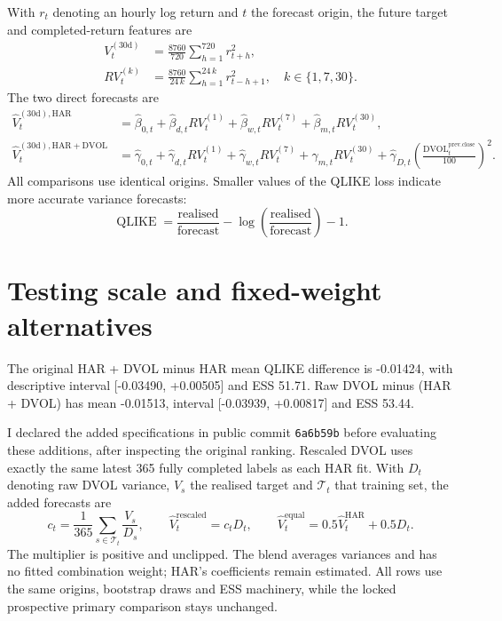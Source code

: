 \documentclass[10pt,a4paper]{article}
\newcommand{\Unit}{1}
\newcommand{\PowerTwo}{2}
\newcommand{\InterceptIndex}{0}
\newcommand{\HorizonDays}{30}
\newcommand{\TargetHours}{720}
\newcommand{\AnnualHoursPlain}{8760}
\newcommand{\HoursPerDay}{24}
\newcommand{\DailyDays}{1}
\newcommand{\WeeklyDays}{7}
\newcommand{\MonthlyDays}{30}
\newcommand{\PercentScale}{100}
\newcommand{\PairedLossMean}{-0.01424}
\newcommand{\PairedLossLower}{-0.03490}
\newcommand{\PairedLossUpper}{+0.00505}
\newcommand{\PairedLossEffectiveN}{51.71}
\newcommand{\TrainingLabels}{365}
\newcommand{\QLIKEUnit}{1}
\newcommand{\RawPairedMean}{-0.01513}
\newcommand{\RawPairedLower}{-0.03939}
\newcommand{\RawPairedUpper}{+0.00817}
\newcommand{\RawPairedESS}{53.44}
\newcommand{\BlendWeight}{0.5}
\newcommand{\ExtensionSpecificationCommit}{6a6b59b}
\begin{document}
With $r_t$ denoting an hourly log return and $t$ the forecast origin, the future target and completed-return features are
\begin{align*}
V_t^{(\HorizonDays{}\mathrm{d})} &= \frac{\AnnualHoursPlain{}}{\TargetHours{}}
  \sum_{h=\Unit{}}^{\TargetHours{}} r_{t+h}^{\PowerTwo{}},\\
RV_t^{(k)} &= \frac{\AnnualHoursPlain{}}{\HoursPerDay{}\,k}
  \sum_{h=\Unit{}}^{\HoursPerDay{}\,k}r_{t-h+\Unit{}}^{\PowerTwo{}},
\quad k\in\{\DailyDays{},\WeeklyDays{},\MonthlyDays{}\}.
\end{align*}
The two direct forecasts are
\begin{align*}
\widehat V^{(\HorizonDays{}\mathrm{d}),\mathrm{HAR}}_t
 &= \widehat\beta_{\InterceptIndex{},t}
  +\widehat\beta_{d,t}RV_t^{(\DailyDays{})}
  +\widehat\beta_{w,t}RV_t^{(\WeeklyDays{})}
  +\widehat\beta_{m,t}RV_t^{(\MonthlyDays{})},\\
\widehat V^{(\HorizonDays{}\mathrm{d}),\mathrm{HAR+DVOL}}_t
 &= \widehat\gamma_{\InterceptIndex{},t}
  +\widehat\gamma_{d,t}RV_t^{(\DailyDays{})}
  +\widehat\gamma_{w,t}RV_t^{(\WeeklyDays{})}
  +\widehat\gamma_{m,t}RV_t^{(\MonthlyDays{})}
  +\widehat\gamma_{D,t}
    \left(\frac{\mathrm{DVOL}^{\mathrm{prev.close}}_t}{\PercentScale{}}\right)^{\PowerTwo{}}.
\end{align*}
All comparisons use identical origins. Smaller values of the QLIKE loss indicate more accurate variance forecasts:
\[
\operatorname{QLIKE}
 =\frac{\text{realised}}{\text{forecast}}
  -\log\!\left(\frac{\text{realised}}{\text{forecast}}\right)
  -\QLIKEUnit{}.
\]

\section{Testing scale and fixed-weight alternatives}

The original HAR + DVOL minus HAR mean QLIKE difference is \PairedLossMean{}, with descriptive interval [\PairedLossLower{}, \PairedLossUpper{}] and ESS \PairedLossEffectiveN{}. Raw DVOL minus (HAR + DVOL) has mean \RawPairedMean{}, interval [\RawPairedLower{}, \RawPairedUpper{}] and ESS \RawPairedESS{}.

I declared the added specifications in public commit \texttt{\ExtensionSpecificationCommit{}} before evaluating these additions, after inspecting the original ranking. Rescaled DVOL uses exactly the same latest \TrainingLabels{} fully completed labels as each HAR fit. With $D_t$ denoting raw DVOL variance, $V_s$ the realised target and $\mathcal T_t$ that training set, the added forecasts are
\[
c_t=\frac{\Unit{}}{\TrainingLabels{}}\sum_{s\in\mathcal T_t}\frac{V_s}{D_s},\qquad
\widehat V_t^{\mathrm{rescaled}}=c_tD_t,\qquad
\widehat V_t^{\mathrm{equal}}=\BlendWeight{}\widehat V_t^{\mathrm{HAR}}+\BlendWeight{}D_t.
\]
The multiplier is positive and unclipped. The blend averages variances and has no fitted combination weight; HAR's coefficients remain estimated. All rows use the same origins, bootstrap draws and ESS machinery, while the locked prospective primary comparison stays unchanged.
\end{document}

